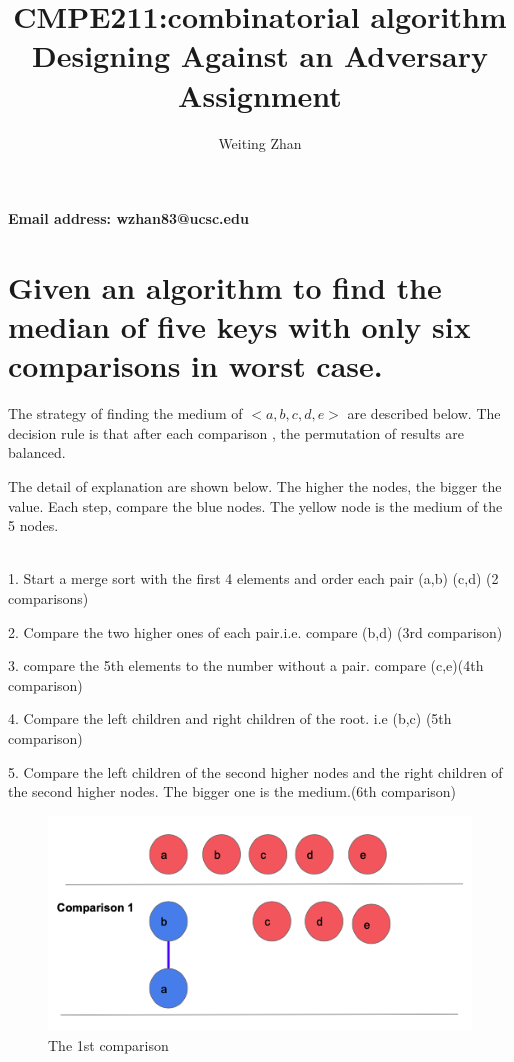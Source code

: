 \documentclass[12pt]{article}
\title{CMPE211:combinatorial algorithm Designing Against an Adversary Assignment}
\author{Weiting Zhan}
\theoremstyle{plain}
\begin{document}
\maketitle

\begin{center}
\textbf{Email address: wzhan83@ucsc.edu}
\end{center}


\section{Given an algorithm to find the median of five keys with only six comparisons in worst case.}


The strategy of finding the medium of  $<a,b,c,d,e>$ are described below. The decision rule is that after each comparison , the permutation of results are balanced.











The detail of explanation are shown below. The higher the nodes, the bigger the value. Each step, compare the blue nodes. The yellow node is the medium of the 5 nodes.


\\1.  Start a merge sort with the first 4 elements and order each pair (a,b) (c,d) (2 comparisons) 

2.  Compare the two higher ones of each pair.i.e. compare (b,d) (3rd comparison)  

3.  compare the 5th elements to the number without a pair. compare (c,e)(4th comparison) 

4.  Compare the left children and right children of the root. i.e (b,c) (5th comparison) 


5.  Compare the left children of the second higher nodes and the right children of the second higher nodes. The bigger one is the medium.(6th comparison) 

\begin{figure}[h]
\includegraphics[width=12cm]{1.png}
\centering
\caption{The 1st comparison}
\label{BF}
\end{figure}
\end{document}
